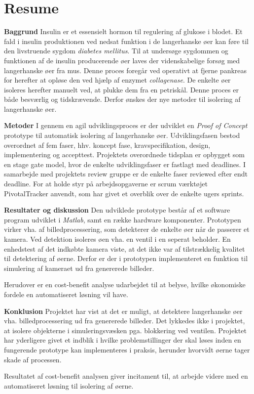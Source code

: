 \section*{Resume}
\textbf{Baggrund}
Insulin er et essensielt hormon til regulering af glukose i blodet. Et fald i insulin produktionen ved nedsat funktion i de langerhanske øer kan føre til den livstruende sygdom \textit{diabetes mellitus}. Til at undersøge sygdommen og funktionen af de insulin producerende øer laves der videnskabelige forsøg med langerhanske øer fra mus. Denne proces foregår ved operativt at fjerne pankreas for herefter at opløse den ved hjælp af enzymet \textit{collagenase}. De enkelte øer isoleres herefter manuelt ved, at plukke dem fra en petriskål. Denne proces er både besværlig og tidskrævende. Derfor ønskes der nye metoder til isolering af langerhanske øer.

\textbf{Metoder} I gennem en agil udviklingsproces er der udviklet en \textit{Proof of Concept} prototype til automatisk isolering af langerhanske øer. Udviklingsfasen bestod overordnet af fem faser, hhv. koncept fase, kravspecifikation, design, implementering og accepttest. Projektets overordnede tidsplan er opbygget som en stage gate model, hvor de enkelte udviklingsfaser er fastlagt med deadlines. I samarbejde med projektets review gruppe er de enkelte faser reviewed efter endt deadline. For at holde styr på arbejdsopgaverne er scrum værktøjet PivotalTracker anvendt, som har givet et overblik over de enkelte ugers sprints.

\textbf{Resultater og diskussion} Den udviklede prototype består af et software program udviklet i \textit{Matlab}, samt en række hardware komponenter. Prototypen virker vha. af billedprocessering, som detekterer de enkelte øer når de passerer et kamera. Ved detektion isoleres øen vha. en ventil i en seperat beholder. En enhedstest af det indkøbte kamera viste, at det ikke var af tilstrækkelig kvalitet til detektering af øerne. Derfor er der i prototypen implementeret en funktion til simulering af kameraet ud fra genererede billeder.
 
Herudover er en cost-benefit analyse udarbejdet til at belyse, hvilke økonomiske fordele en automatiseret løsning vil have.   


\textbf{Konklusion} Projektet har vist at det er muligt, at detektere langerhanske øer vha. billedprocessering ud fra genererede billeder. Det lykkedes ikke i projektet, at isolere objekterne i simuleringsvæsken pga. blokkering ved ventilen. Projektet har yderligere givet et indblik i hvilke problemstillinger der skal løses inden en fungerende prototype kan implementeres i praksis, herunder hvorvidt øerne tager skade af processen. 

Resultatet af cost-benefit analysen giver incitament til, at arbejde videre med en automatiseret løsning til isolering af øerne. 



